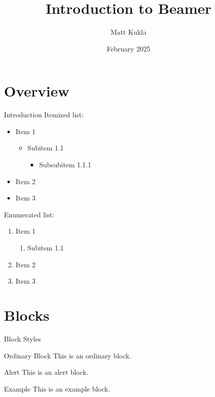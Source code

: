 \documentclass{beamer}
\title{Introduction to Beamer}
\author{Matt Kukla}
\date{February 2025}
\begin{document}
\frame{\titlepage}

\frame{\tableofcontents}

\section{Overview}
\begin{frame}{Introduction}
    Itemized list:
    \begin{itemize}
        \item Item 1
            \begin{itemize}
                \item Subitem 1.1
                \begin{itemize}
                    \item Subsubitem 1.1.1
                \end{itemize}
            \end{itemize}
        \item Item 2
        \item Item 3
    \end{itemize}
    Enumerated list:
    \begin{enumerate}
        \item Item 1
            \begin{enumerate}
                \item Subitem 1.1
            \end{enumerate}
        \item Item 2
        \item Item 3
    \end{enumerate}
\end{frame}

\section{Blocks}
\begin{frame}{Block Styles}

    \begin{block}{Ordinary Block}
        This is an ordinary block.
    \end{block}
    \begin{alertblock}{Alert}
        This is an alert block.
    \end{alertblock}
    \begin{exampleblock}{Example}
        This is an example block.
    \end{exampleblock}
\end{frame}
\end{document}
